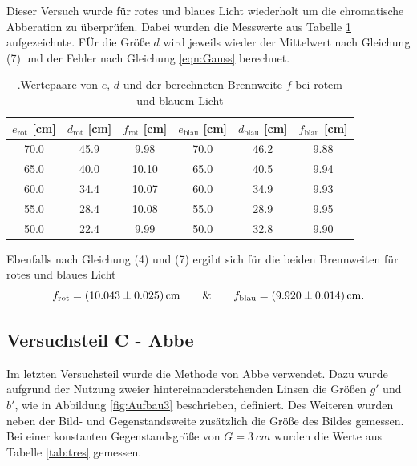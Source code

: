 Dieser Versuch wurde für rotes und blaues Licht wiederholt um die chromatische Abberation zu überprüfen.
Dabei wurden die Messwerte aus Tabelle \ref{tab:farbe} aufgezeichnte.
FÜr die Größe $d$ wird jeweils wieder der Mittelwert nach Gleichung (7) und der Fehler nach Gleichung \ref{eqn:Gauss} berechnet.

\begin{table}[H]
    \begin{center}
      \caption{.Wertepaare von $e$, $d$ und der berechneten Brennweite $f$ bei rotem und blauem Licht}
      \label{tab:farbe}
      \begin{tabular}{c|c|c||c|c|c} 
        \textbf{$e_\text{rot}$ [cm]} & \textbf{$d_\text{rot}$ [cm]} & \textbf{$f_\text{rot}$ [cm]} & \textbf{$e_\text{blau}$ [cm]} & \textbf{$d_\text{blau}$ [cm]} & \textbf{$f_\text{blau}$ [cm]}\\
        \hline
        70.0 & 45.9 & 9.98 & 70.0 & 46.2 & 9.88 \\
        65.0 & 40.0 & 10.10 & 65.0 & 40.5 & 9.94 \\
        60.0 & 34.4 & 10.07 & 60.0 & 34.9 & 9.93 \\
        55.0 & 28.4 & 10.08 & 55.0 & 28.9 & 9.95 \\
        50.0 & 22.4 & 9.99 & 50.0 & 32.8 & 9.90
      \end{tabular}
    \end{center}
\end{table}

Ebenfalls nach Gleichung (4) und (7) ergibt sich für die beiden Brennweiten für rotes und blaues Licht
\begin{equation}
    f_\text{rot} = \SI{10.043 \pm 0.025}{cm} \qquad \text{\&} \qquad f_\text{blau} = \SI{9.920 \pm 0.014}{cm}.    \notag
\end{equation}

\subsection{Versuchsteil C - Abbe}
Im letzten Versuchsteil wurde die Methode von Abbe verwendet.
Dazu wurde aufgrund der Nutzung zweier hintereinanderstehenden Linsen die Größen $g'$ und $b'$, wie in Abbildung \ref{fig:Aufbau3} beschrieben, definiert.
Des Weiteren wurden neben der Bild- und Gegenstandsweite zusätzlich die Größe des Bildes gemessen.
Bei einer konstanten Gegenstandsgröße von $G = \SI{3}{cm}$ wurden die Werte aus Tabelle \ref{tab:tres} gemessen.

